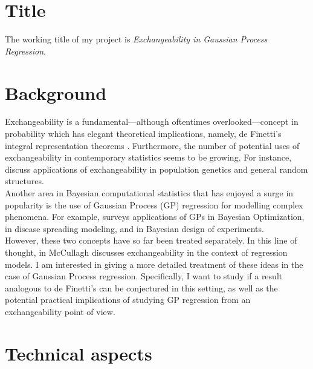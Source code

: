 \documentclass[]{STAT_547C}
\begin{document}
\vspace{-2cm}


\section{Title}

The working title of my project is \emph{Exchangeability in Gaussian Process Regression}.  

\section{Background}


Exchangeability is a fundamental---although oftentimes overlooked---concept in probability which has elegant theoretical implications, namely, de Finetti's integral representation theorems \cite{deFinetti:1930:RepTheorem}. Furthermore, the number of potential uses of exchangeability in contemporary statistics seems to be growing. For instance, \cite{Kingman:1978, Aldous:2010, Orbanz:Roy:2015} discuss applications of exchangeability in population genetics and general random structures. \\

Another area in Bayesian computational statistics that has enjoyed a surge in popularity is the use of Gaussian Process (GP) regression for modelling complex phenomena. For example, \cite{Frazier:2018:BayesOptTutorial} surveys applications of GPs in Bayesian Optimization, \cite{PokharelDeardon:2016:GPInfectDisease} in disease spreading modeling, and \cite{WoodsEtAl:2017:ACEAlgorithm} in Bayesian design of experiments. \\

However, these two concepts have so far been treated separately. In this line of thought, in \cite{McCullagh:2005:ExchAndReg} McCullagh discusses exchangeability in the context of regression models. I am interested in giving a more detailed treatment of these ideas in the case of Gaussian Process regression. Specifically, I want to study if a result analogous to de Finetti's can be conjectured in this setting, as well as the potential practical implications of studying GP regression from an exchangeability point of view.



\section{Technical aspects}
\end{document}
